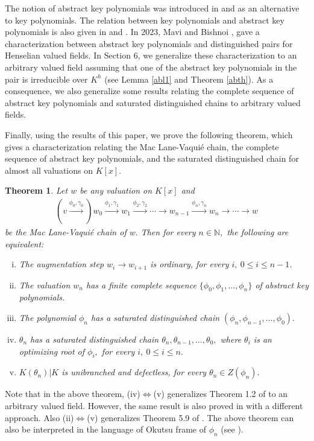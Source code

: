 \documentclass[11pt]{amsart}
\newtheorem{theorem}{Theorem}[section]
\theoremstyle{definition}
\theoremstyle{remark}
\numberwithin{equation}{section}
\begin{document}
	The notion of abstract key polynomials was introduced in \cite{JD} and \cite{NS} as an alternative to key polynomials. The relation between key polynomials and abstract key polynomials is also given in \cite{JD} and \cite{Ma}. In 2023, Mavi and Bishnoi \cite{SA3}, gave a characterization between abstract key polynomials and distinguished pairs for Henselian valued fields. In Section 6, we generalize these characterization to an arbitrary valued field assuming that one of the abstract key polynomials in the pair is irreducible over $K^h$ (see Lemma \ref{abl1} and Theorem \ref{abth}). As a consequence, we also generalize some results relating the complete sequence of abstract key polynomials and saturated distinguished chains to arbitrary valued fields.
	
	Finally, using the results of this paper, we prove the following theorem, which gives a characterization relating the Mac Lane-Vaqui\'e chain, the complete sequence of abstract key polynomials, and the saturated distinguished chain for almost all valuations on $K[x].$
	
	 \begin{theorem}\label{th1}
		Let $w$ be any valuation on $K[x]$ and
		\begin{align*}
			(v\xrightarrow{\phi_0,\gamma_0})	w_0\xrightarrow{\phi_1,\gamma_1} w_1\xrightarrow{\phi_2,\gamma_2}\cdots \longrightarrow w_{n-1} \xrightarrow{\phi_{n},\gamma_{n}} w_{n}\longrightarrow\cdots\longrightarrow w
		\end{align*}
		be the Mac Lane-Vaqui\'e chain of $w.$ Then for every $n\in \mathbb{N},$ the following are equivalent:
		\begin{enumerate}[(i)]
			\item The augmentation step $w_i\longrightarrow w_{i+1}$ is ordinary, for every $i,\ 0\leq i\leq n-1$.
			\item The valuation $w_n$ has  a finite complete sequence $\{\phi_0, \phi_{1},\ldots,\phi_n\}$   of abstract key polynomials.
			\item  The polynomial $\phi_n$  has a saturated distinguished chain $(\phi_n, \phi_{n-1},\ldots, \phi_0).$ 
			\item $\theta_n$ has a saturated distinguished chain $\theta_n, \theta_{n-1},\ldots, \theta_0,$ where $\theta_i$ is an optimizing root of $\phi_i,$ for every $i,\ 0\leq i\leq n.$
			\item $K(\theta_n)|K$ is unibranched and defectless, for every $\theta_n\in Z(\phi_n).$
		\end{enumerate}
	\end{theorem}
	 Note that in the above theorem, (iv)$\iff$(v) generalizes Theorem 1.2 of \cite{AK2} to an arbitrary valued field. However, the same result is also proved in \cite[Theorem 1.2]{AR} with a different approach. Also (ii)$\iff$(v) generalizes Theorem 5.9 of \cite{SD}. The above theorem can also be interpreted in the language of Okutsu frame of $\phi_n$ (see \cite[Theorem 4.4 and Theorem 4.5]{M2}).
	 
\end{document}
